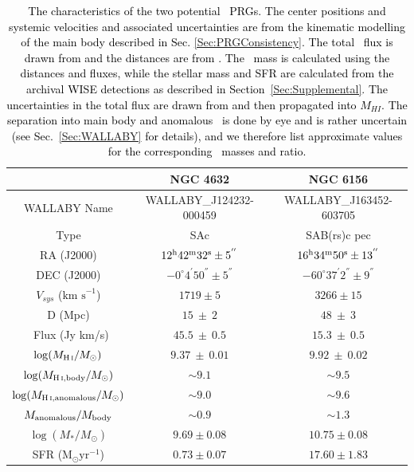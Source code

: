 \documentclass[fleqn,usenatbib]{mnras}
\newcommand{\kms}{\textrm{km s}^{-1}}
\newcommand{\hi}{\text{H\,\sc{i}}}
\newcommand{\Msol}{\textrm{M}_{\odot}}
\newcommand{\KS}[1]{\textcolor{black}{#1}}
\begin{document}
\begin{table}
    \centering
    \begin{tabular}{|c|c|c|}
          &  NGC 4632 & NGC 6156\\
         \hline 
         WALLABY Name & WALLABY\_J124232-000459 & WALLABY\_J163452-603705 \\
         Type & SAc & SAB(rs)c pec \\
         RA (J2000) & $12^{\rm{h}}42^{\rm{m}}32^{\rm{s}}\pm5^{''}$ & $16^{\rm{h}}34^{\rm{m}}50^{\rm{s}}\pm13^{''}$ \\
         DEC (J2000) & $-0^{\circ}4^{'}50^{''}\pm5^{''}$  & $-60^{\circ}37^{'}2^{''}\pm9^{''}$ \\
         $V_{sys}$ ($\kms$) & $1719\pm5$ & $3266\pm15$ \\
         D (Mpc) & $15~\pm~2$  & $48~\pm~3$ \\
         \hi\ Flux (Jy km/s) & $45.5~\pm~0.5 $ & $15.3~\pm ~0.5$ \\
         $\log(M_{\hi}/M_{\odot})$  & $9.37~\pm~0.01$  & $9.92~\pm~0.02$ \\
         $\log(M_{\hi,\rm{body}}/M_{\odot})$  & $\sim9.1$  &  $\sim9.5$\\
         $\log(M_{\hi,\rm{anomalous}}/M_{\odot})$  & $\sim9.0$  & $\sim9.6$ \\
         $M_{\rm{anomalous}}/M_{\rm{body}}$ & $\sim0.9$ & $\sim1.3$\\
         $\log(M_{*}/M_{\odot})$ & $9.69\pm 0.08$ & $10.75\pm 0.08$\\
         SFR ($\Msol \textrm{yr}^{-1}$) & $0.73\pm 0.07$ & $17.60 \pm 1.83$\\
         \hline
    \end{tabular}
    \caption{\textcolor{black}{The characteristics of the two \textcolor{black}{potential \hi\ PRGs}.  The center positions and systemic velocities and associated uncertainties are from the kinematic modelling of the main body described in Sec. \ref{Sec:PRGConsistency}.  The total \hi\ flux is drawn from \citet{SoFiARelease} and the distances are from \citet{Tully2016}. The \hi\ mass is calculated using the distances and fluxes, while the stellar mass and SFR are calculated from the archival WISE detections as described in Section~\ref{Sec:Supplemental}.}  \textcolor{black}{The uncertainties in the total flux are drawn from \citet{SoFiARelease} and \KS{then propagated into $M_{HI}$. The separation into main body and anomalous \hi\ is done by eye and is rather uncertain (see Sec.~\ref{Sec:WALLABY} for details), and we therefore list approximate values for the corresponding \hi\ masses and ratio.}}}
    \label{tab:GalaxyCharacteristics}
\end{table}
\end{document}
